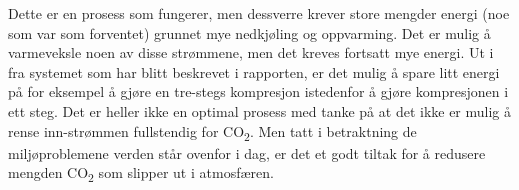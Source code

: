 Dette er en prosess som fungerer, men dessverre krever store mengder energi (noe som var som forventet) grunnet mye nedkjøling og oppvarming. Det er mulig å varmeveksle noen av disse strømmene, men det kreves fortsatt mye energi. Ut i fra systemet som har blitt beskrevet i rapporten, er det mulig å spare litt energi på for eksempel å gjøre en tre-stegs kompresjon istedenfor å gjøre kompresjonen i ett steg. Det er heller ikke en optimal prosess med tanke på at det ikke er mulig å rense inn-strømmen fullstendig for CO\textsubscript{2}. Men tatt i betraktning de miljøproblemene verden står ovenfor i dag, er det et godt tiltak for å redusere mengden CO\textsubscript{2} som slipper ut i atmosfæren. 